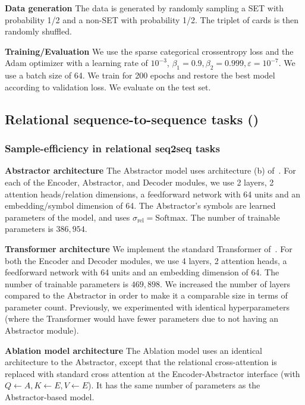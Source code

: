 \textbf{Data generation} The data is generated by randomly sampling a SET with probability 1/2 and a non-SET with probability 1/2. The triplet of cards is then randomly shuffled.

\textbf{Training/Evaluation} We use the sparse categorical crossentropy loss and the Adam optimizer with a learning rate of $10^{-3}$, $\beta_1 = 0.9, \beta_2 = 0.999, \varepsilon = 10^{-7}$. We use a batch size of 64. We train for 200 epochs and restore the best model according to validation loss. We evaluate on the test set.


\subsection{Relational sequence-to-sequence tasks ()}

\subsubsection{Sample-efficiency in relational seq2seq tasks }

\textbf{Abstractor architecture} The Abstractor model uses architecture (b) of~. For each of the Encoder, Abstractor, and Decoder modules, we use 2 layers, 2 attention heads/relation dimensions, a feedforward network with 64 units and an embedding/symbol dimension of 64. The Abstractor's symbols are learned parameters of the model, and uses $\sigma_{\mathrm{rel}} = \mathrm{Softmax}$. The number of trainable parameters is $386,954$.

\textbf{Transformer architecture} We implement the standard Transformer of~\citep{vaswani2017attention}. For both the Encoder and Decoder modules, we use 4 layers, 2 attention heads, a feedforward network with 64 units and an embedding dimension of 64. The number of trainable parameters is $469,898$. We increased the number of layers compared to the Abstractor in order to make it a comparable size in terms of parameter count. Previously, we experimented with identical hyperparameters (where the Transformer would have fewer parameters due to not having an Abstractor module).

\textbf{Ablation model architecture} The Ablation model uses an identical architecture to the Abstractor, except that the relational cross-attention is replaced with standard cross attention at the Encoder-Abstractor interface (with $Q \gets A, K \gets E, V \gets E$). It has the same number of parameters as the Abstractor-based model.

